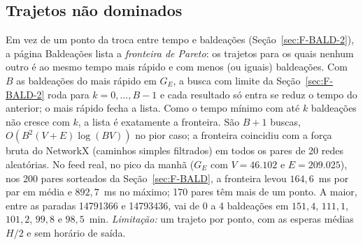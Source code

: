 \subsection{Trajetos não dominados}\label{sec:F-BALD-OPC}

Em vez de um ponto da troca entre tempo e baldeações (Seção~\ref{sec:F-BALD-2}), a página
Baldeações lista a \emph{fronteira de Pareto}: os trajetos para os quais nenhum outro é ao
mesmo tempo mais rápido e com menos (ou iguais) baldeações. Com $B$ as baldeações do mais
rápido em $G_E$, a busca com limite da Seção~\ref{sec:F-BALD-2} roda para
$k = 0, \dots, B - 1$ e cada resultado só entra se reduz o tempo do anterior; o mais rápido
fecha a lista. Como o tempo mínimo com até $k$ baldeações não cresce com $k$, a lista é
exatamente a fronteira. São $B + 1$ buscas, $O(B^2 (V + E)\log(BV))$ no pior caso; a
fronteira coincidiu com a força bruta do NetworkX (caminhos simples filtrados) em todos os
pares de 20 redes aleatórias. No feed real, no pico da manhã ($G_E$ com $V = 46.102$ e
$E = 209.025$), nos 200 pares sorteados da Seção~\ref{sec:F-BALD}, a fronteira levou
$164{,}6$~ms por par em média e $892{,}7$~ms no máximo; 170 pares têm mais de um ponto. A
maior, entre as paradas 14791366 e 14793436, vai de 0 a 4 baldeações em $151{,}4$,
$111{,}1$, $101{,}2$, $99{,}8$ e $98{,}5$~min. \emph{Limitação:} um trajeto por ponto, com as esperas médias
$H/2$ e sem horário de saída.
